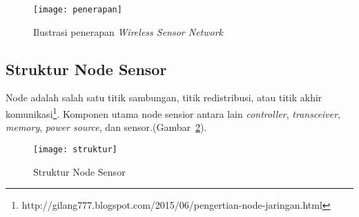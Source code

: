 \begin{figure}[H] 
	\centering  
	\texttt{[image: penerapan]}  
	\caption[Ilustrasi penerapan \textit{Wireless Sensor Network}]{Ilustrasi penerapan \textit{Wireless Sensor Network}}
	\label{fig:penerapan} 
\end{figure} 

\subsection{Struktur Node Sensor}
\label{struktur}
Node adalah salah satu titik sambungan, titik redistribusi, atau titik akhir komunikasi\footnote{http://gilang777.blogspot.com/2015/06/pengertian-node-jaringan.html}. Komponen utama node sensior antara lain \textit{controller}, \textit{transceiver}, \textit{memory}, \textit{power source}, dan sensor.(Gambar~\ref{fig:struktur}).  

\begin{figure}[H] 
	\centering  
	\texttt{[image: struktur]}  
	\caption[Struktur Node Sensor]{Struktur Node Sensor}
	\label{fig:struktur} 
\end{figure} 


